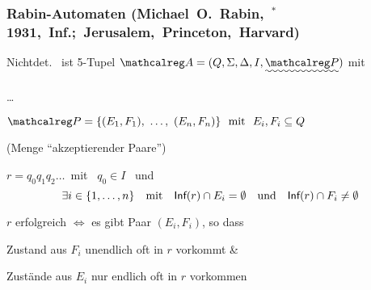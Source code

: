     \begin{frame}[t]
      \frametitle{Rabin-Automaten \hfill \mbox{{\footnotesize (Michael O.\ Rabin, ${}^*$1931, Inf.; Jerusalem, Princeton, Harvard)}}\hspace*{-2.5mm}}

      \begin{Definition}{}
        Nichtdet.\  ist 5-$\!$Tupel $\Aut{A} = (Q, \Sigma, \Delta, I, \Uwave{\calP})$ mit
        \begin{Itemize}
          \item
            \dots
          \item
            $\calP = \{(E_1,F_1),~\dots,~(E_n,F_n)\} \text{~~mit~~} E_i,F_i \subseteq Q$
            \par\smallskip
            (Menge "`akzeptierender Paare"')
        \end{Itemize}
        \par\medskip
         $r = q_0q_1q_2\dots$~mit~
        $q_0 \in I$ ~und
        \[
          \exists i \in\{1,\dots,n\}
          \text{~~~mit~~~}
          \textsf{Inf}(r) \cap E_i = \emptyset
          \text{~~~und~~~}
          \textsf{Inf}(r) \cap F_i \neq \emptyset
        \]
      \end{Definition}

      \par\bigskip
       $r$ erfolgreich $\Leftrightarrow$ es gibt Paar $(E_i,F_i)$, so dass
      \begin{Itemize}
        \item
           Zustand aus $F_i$ unendlich oft in $r$ vorkommt \&
        \item
           Zustände aus $E_i$ nur endlich oft in $r$ vorkommen
          \Tafel
      \end{Itemize}

    \end{frame}

